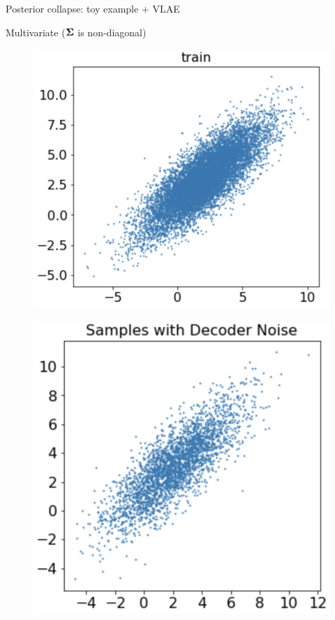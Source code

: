 \documentclass{beamer}
\begin{document}
\begin{frame}{Posterior collapse: toy example + VLAE}
	\begin{block}{Multivariate ($\boldsymbol{\Sigma}$ is non-diagonal)}
		\vspace{-0.5cm}
		\begin{minipage}[t]{0.33\columnwidth}
			\begin{figure}[h]
				\centering
				\includegraphics[width=.8\linewidth]{figs/posterior_collapse_toy_1.png}
			\end{figure}
		\end{minipage}%
		\begin{minipage}[t]{0.33\columnwidth}
			\begin{figure}[h]
				\centering
				\includegraphics[width=0.75\linewidth]{figs/posterior_collapse_toy_3.png}

\end{figure}
\end{minipage}
\end{block}
\end{frame}
\end{document}
